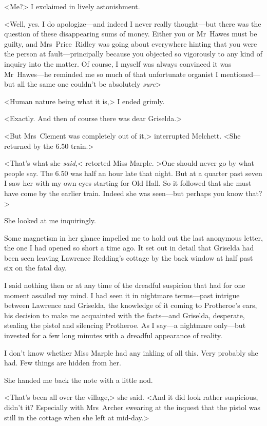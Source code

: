 <Me?> I exclaimed in lively astonishment.

<Well, yes. I do apologize—and indeed I never really thought—but there was the question of these disappearing sums of money. Either you or Mr~Hawes must be guilty, and Mrs~Price~Ridley was going about everywhere hinting that you were the person at fault—principally because you objected so vigorously to any kind of inquiry into the matter. Of course, I myself was always convinced it was Mr~Hawes—he reminded me so much of that unfortunate organist I mentioned—but all the same one couldn't be absolutely \emph{sure}\longdash>

<Human nature being what it is,> I ended grimly.

<Exactly. And then of course there was dear Griselda.>

<But Mrs~Clement was completely out of it,> interrupted Melchett. <She returned by the 6.50 train.>

<That's what she \emph{said},< retorted Miss Marple. >One should never go by what people say. The 6.50 was half an hour late that night. But at a quarter past seven I saw her with my own eyes starting for Old Hall. So it followed that she must have come by the earlier train. Indeed she was seen—but perhaps you know that?>

She looked at me inquiringly.

Some magnetism in her glance impelled me to hold out the last anonymous letter, the one I had opened so short a time ago. It set out in detail that Griselda had been seen leaving Lawrence Redding's cottage by the back window at half past six on the fatal day.

I said nothing then or at any time of the dreadful suspicion that had for one moment assailed my mind. I had seen it in nightmare terms—past intrigue between Lawrence and Griselda, the knowledge of it coming to Protheroe's ears, his decision to make me acquainted with the facts—and Griselda, desperate, stealing the pistol and silencing Protheroe. As I say—a nightmare only—but invested for a few long minutes with a dreadful appearance of reality.

I don't know whether Miss Marple had any inkling of all this. Very probably she had. Few things are hidden from her.

She handed me back the note with a little nod.

<That's been all over the village,> she said. <And it did look rather suspicious, didn't it? Especially with Mrs~Archer swearing at the inquest that the pistol was still in the cottage when she left at mid-day.>

